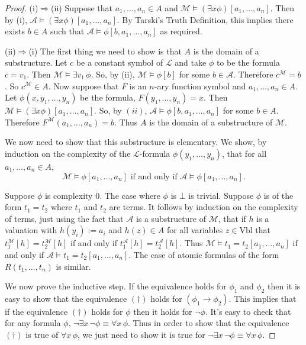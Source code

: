 \documentclass[11pt]{article}
\newcommand{\Vbl}{\textrm{Vbl}}
\newcommand{\mcal}[1]{\mathcal{#1}}
\begin{document}
\begin{proof}
(i)$\Rightarrow$(ii) Suppose that $a_1,\ldots,a_n\in A$ and $\mcal{M}\models (\exists x\phi)[a_1,\ldots,a_n]$. Then by (i), $\mcal{A}\models (\exists x\phi)[a_1,\ldots,a_n]$. By Tarski's Truth Definition, this implies there exists $b\in A$ such that $\mcal{A}\models \phi[b,a_1,\ldots,a_n]$ as required.

\medskip

\noindent
%
(ii)$\Rightarrow$(i) The first thing we need to show is that $A$ is the domain of a substructure.
Let $c$ be a constant symbol of $\mcal{L}$ and take $\phi$ to be the formula $c=v_1$.
Then $\mcal{M}\models \exists v_1\, \phi$. So, by (ii), $\mcal{M}\models \phi[b]$ for some $b\in \mcal{A}$. Therefore $c^{\mcal{M}}=b$. So $c^{\mcal{M}}\in A$. Now suppose that $F$ is an $n$-ary function symbol and $a_1,\ldots,a_n\in A$. Let $\phi(x,y_1,\ldots,y_n)$ be the formula, $F(y_1,\ldots,y_n)=x$.
Then $\mcal{M}\models(\exists x\phi)[a_1,\ldots,a_n]$. So, by $(ii)$, $\mcal{A}\models \phi[b,a_1,\ldots,a_n]$ for some $b\in A$.
Therefore $F^{\mcal{M}}(a_1,\ldots,a_n)=b$. Thus $A$ is the domain of a substructure of $\mcal{M}$.

We now need to show that this substructure is elementary. We show, by induction on the complexity of the $\mcal{L}$-formula $\phi(y_1,\ldots,y_n)$, that for all $a_1,\ldots, a_n\in A$,
\[\mcal{M}\models \phi[a_1,\ldots,a_n] \text{ if and only if }\mcal{A}\models \phi[a_1,\ldots,a_n].\tag{$\dagger$}\]


Suppose $\phi$ is complexity $0$. The case where $\phi$ is $\bot$ is trivial. Suppose $\phi$ is of the form $t_1=t_2$ where $t_1$ and $t_2$ are terms. It follows by induction on the complexity of terms, just using the fact that $\mcal{A}$ is a substructure of $\mcal{M}$, that if $h$ is a valuation with $h(y_i):=a_i$ and $h(z)\in A$ for all variables $z\in\Vbl$ that $t_1^\mcal{M}[h]=t_2^\mcal{M}[h]$ if and only if $t_1^\mcal{A}[h]=t_2^\mcal{A}[h]$. Thus $\mcal{M}\models t_1=t_2[a_1,\ldots,a_n]$ if and only if $\mcal{A}\models t_1=t_2[a_1,\ldots,a_n]$. The case of atomic formulas of the form $R(t_1,\ldots,t_n)$ is similar.

We now prove the inductive step.
If the equivalence holds for $\phi_1$ and $\phi_2$ then it is easy to show that the equivalence $(\dagger)$ holds for $(\phi_1\rightarrow \phi_2)$. This implies that if the equivalence $(\dagger)$ holds for $\phi$ then it holds for $\neg \phi$. It's easy to check that for any formula $\phi$, $\neg\exists x\, \neg\phi\equiv \forall x\, \phi$. Thus in order to show that the equivalence $(\dagger)$ is true of $\forall x\,\phi$, we just need to show it is true for $\neg\exists x\, \neg\phi\equiv \forall x\, \phi$.


\end{proof}
\end{document}
